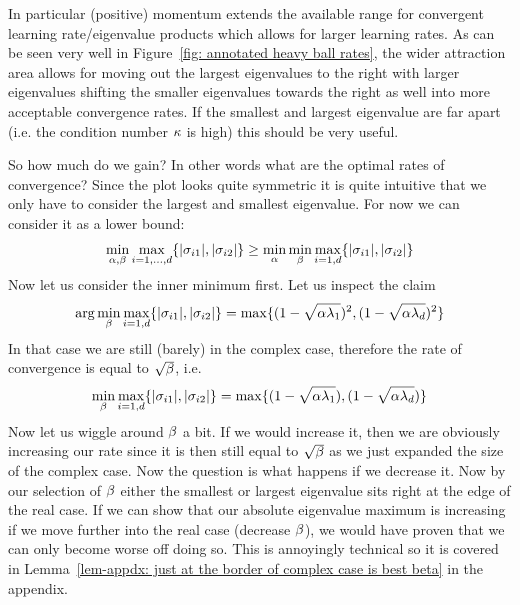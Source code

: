 In particular (positive) momentum extends the available range for convergent
learning rate/eigenvalue products which allows for larger learning rates. As
can be seen very well in Figure~\ref{fig: annotated heavy ball rates}, the
wider attraction area allows for moving out the largest eigenvalues to the
right with larger eigenvalues shifting the smaller eigenvalues towards the
right as well into more acceptable convergence rates. If the smallest and
largest eigenvalue are far apart (i.e. the condition number \(\kappa\) is
high) this should be very useful.

So how much do we gain? In other words what are the optimal rates of
convergence? Since the plot looks quite symmetric it is quite intuitive that
we only have to consider the largest and smallest eigenvalue. For now we
can consider it as a lower bound:
\begin{align}\label{eq: lower bound best heavy ball rates}
	\min_{\alpha,\beta}\max_{i=1,\dots,d}\{|\sigma_{i1}|,|\sigma_{i2}|\}
	\ge \min_{\alpha}\min_{\beta}
	\max_{i=1,d}\{|\sigma_{i1}|,|\sigma_{i2}|\}
\end{align}
Now let us consider the inner minimum first. Let us inspect the claim
\begin{align}
	\arg\min_{\beta}\max_{i=1,d}\{|\sigma_{i1}|,|\sigma_{i2}|\}
	= \max\{(1-\sqrt{\alpha\lambda_1})^2, (1-\sqrt{\alpha\lambda_d})^2\}
\end{align}\label{eq: optimal heavy ball momentum - ev representation}
In that case we are still (barely) in the complex case, therefore the rate
of convergence is equal to \(\sqrt{\beta}\), i.e.
\begin{align*}
	\min_{\beta}\max_{i=1,d}\{|\sigma_{i1}|,|\sigma_{i2}|\}
	= \max\{(1-\sqrt{\alpha\lambda_1}), (1-\sqrt{\alpha\lambda_d})\}
\end{align*}
Now let us wiggle around \(\beta\) a bit. If we would increase it, then
we are obviously increasing our rate since it is then still equal to
\(\sqrt{\beta}\) as we just expanded the size of the complex case. Now the
question is what happens if we decrease it. Now by our selection of \(\beta\)
either the smallest or largest eigenvalue sits right at the edge of the real 
case. If we can show that our absolute eigenvalue maximum is increasing if
we move further into the real case (decrease \(\beta\)), we would have
proven that we can only become worse off doing so. This is annoyingly technical
so it is covered in Lemma~\ref{lem-appdx: just at the border of complex case is
best beta} in the appendix.

